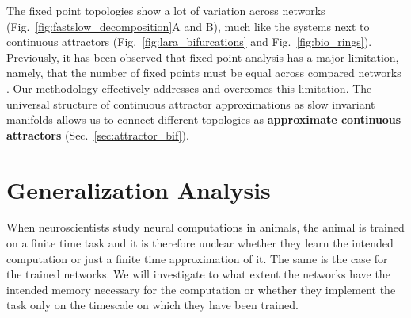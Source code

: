 \documentclass{article} %
\newcounter{ct}
\theoremstyle{definition}
\newtheorem{definition}{Definition}
\theoremstyle{remark}
\begin{document}

The fixed point topologies show a lot of variation across networks (Fig.~\ref{fig:fastslow_decomposition}A and B),
 much like the systems next to continuous attractors (Fig.~\ref{fig:lara_bifurcations} and Fig.~\ref{fig:bio_rings}).
Previously, it has been observed that fixed point analysis has a major limitation, namely, that the number of fixed points must be equal across compared networks  \citep{maheswaranathan2019universality}.
Our methodology effectively addresses and overcomes this limitation.
The universal structure of continuous attractor approximations as slow invariant manifolds allows us to connect different topologies as \textbf{approximate continuous attractors} (Sec.~\ref{sec:attractor_bif}).








\section{Generalization Analysis}


When neuroscientists study neural computations in animals, the animal is trained on a finite time task and it is therefore unclear whether they learn the intended computation or just a finite time approximation of it.
The same is the case for the trained networks.
We will investigate to what extent the networks have the intended memory necessary for the computation or whether they implement the task only on the timescale on which they have been trained.


\end{document}
